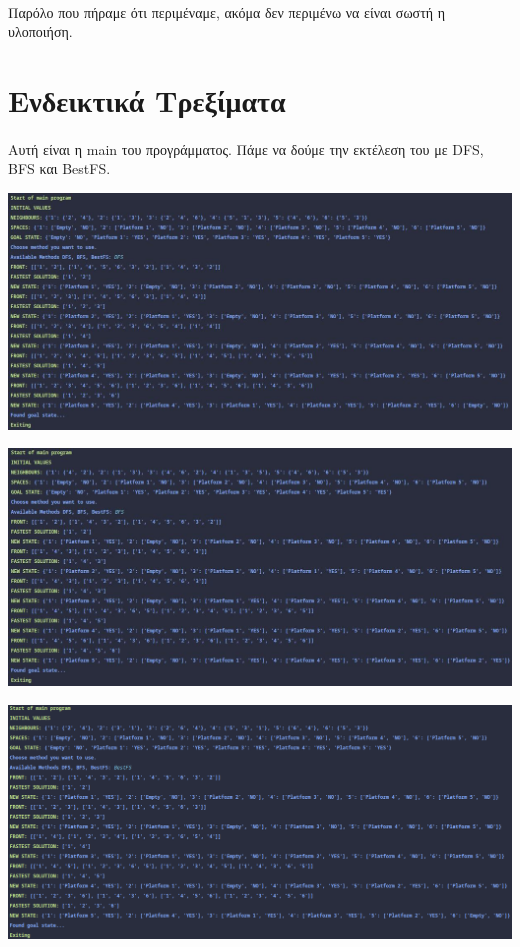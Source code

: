 \documentclass{article}
\begin{document}
    \paragraph{}
    Παρόλο που πήραμε ότι περιμέναμε, ακόμα δεν περιμένω να είναι σωστή η υλοποιήση.

    \newpage
    \section{Ενδεικτικά Τρεξίματα}
    

    \paragraph{}
    Αυτή είναι η main του προγράμματος. Πάμε να δούμε την εκτέλεση του με DFS, BFS και ΒestFS.

    \includegraphics[scale=0.5]{images/main_dfs.jpeg}

    \includegraphics[scale=0.5]{images/main_bfs.jpeg}

    \newpage
    \includegraphics[scale=0.5]{images/main_bestFS.png}
\end{document}
